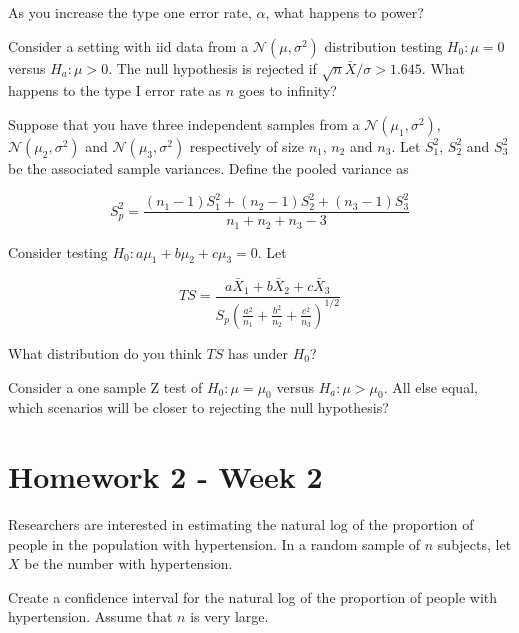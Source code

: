 \documentclass{homework}
\begin{document}
\begin{tcolorbox}[title=Question 10]
As you increase the type one error rate, $\alpha$, what happens to power?
\end{tcolorbox}

\begin{tcolorbox}[title=Question 11]
Consider a setting with iid data from a $\mathcal{N}(\mu, \sigma^2)$ distribution testing $H_0: \mu = 0$ versus $H_a : \mu > 0$. The null hypothesis is rejected if  $\sqrt{n}\bar X / \sigma > 1.645$. What happens to the type I error rate as $n$ goes to infinity?
\end{tcolorbox}

\begin{tcolorbox}[title=Question 12]
Suppose that you have three independent samples from a $\mathcal{N}(\mu_1, \sigma^2)$, $\mathcal{N}(\mu_2, \sigma^2)$ and $\mathcal{N}(\mu_3, \sigma^2)$ respectively of size $n_1$, $n_2$ and $n_3$. Let $S_1^2$, $S_2^2$ and $S_3^2$ be the associated sample variances. Define the pooled variance as

$$
S_p^2 = \frac{(n_1 - 1) S_1^2 + (n_2 - 1) S_2^2 + (n_3 - 1) S_3^2}{n_1 + n_2 + n_3 - 3}
$$

Consider testing $H_0: a \mu_1 + b \mu_2 + c \mu_3 = 0$. Let

$$
TS = \frac{a \bar X_1 + b \bar X_2 + c \bar X_3}{S_p \left( \frac{a^2}{n_1} + \frac{b^2}{n_2} + \frac{c^2}{n_3} \right) ^ { 1/ 2}}
$$

What distribution do you think $TS$ has under $H_0$?
\end{tcolorbox}

\begin{tcolorbox}[title=Question 13]
Consider a one sample Z test of $H_0 : \mu = \mu_0$ versus $H_a : \mu > \mu_0$. All else equal, which scenarios will be closer to rejecting the null hypothesis?
\end{tcolorbox}

\clearpage

\section{Homework 2 - Week 2}

\begin{tcolorbox}[title=Question 1]
Researchers are interested in estimating the natural log of the proportion of people in the population with hypertension. In a random sample of $n$ subjects, let ${X}$ be the number with hypertension. 

Create a confidence interval for the natural log of the proportion of people with hypertension. Assume that $n$ is very large.
\end{tcolorbox}
\end{document}
